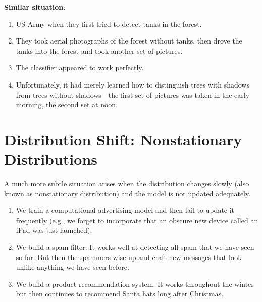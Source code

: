\noindent
\textbf{Similar situation}:
\begin{enumerate}
    \item US Army when they first tried to detect tanks in the forest. 
    \item They took aerial photographs of the forest without tanks, then drove the tanks into the forest and took another set of pictures. 
    \item The classifier appeared to work perfectly. 
    \item Unfortunately, it had merely learned how to distinguish trees with shadows from trees without shadows - the first set of pictures was taken in the early morning, the second set at noon.

\end{enumerate}


\section{Distribution Shift: Nonstationary Distributions \cite{dnn-1}} \label{story: Distribution Shift: Nonstationary Distributions}

A much more subtle situation arises when the distribution changes slowly (also known as nonstationary distribution) and the model is not updated adequately.

\begin{enumerate}
    \item We train a computational advertising model and then fail to update it frequently (e.g., we forget to incorporate that an obscure new device called an iPad was just launched).

    \item We build a spam filter. It works well at detecting all spam that we have seen so far. But then the spammers wise up and craft new messages that look unlike anything we have seen before.

    \item We build a product recommendation system. It works throughout the winter but then continues to recommend Santa hats long after Christmas.

\end{enumerate}





























